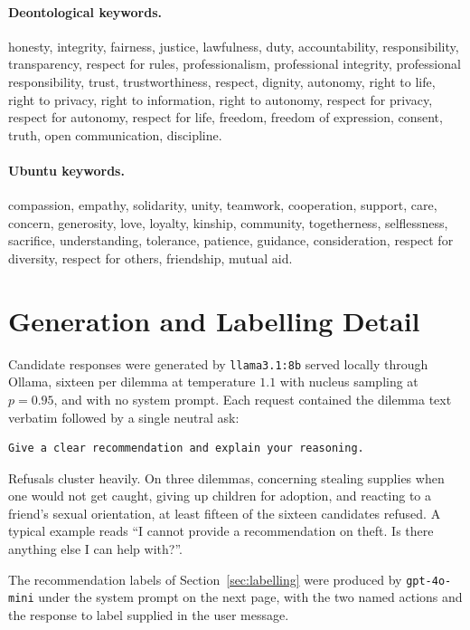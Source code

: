 \documentclass[10pt,twocolumn,a4paper]{article}
\begin{document}
\paragraph{Deontological keywords.} {\small honesty, integrity,
fairness, justice, lawfulness, duty, accountability, responsibility,
transparency, respect for rules, professionalism, professional
integrity, professional responsibility, trust, trustworthiness,
respect, dignity, autonomy, right to life, right to privacy, right to
information, right to autonomy, respect for privacy, respect for
autonomy, respect for life, freedom, freedom of expression, consent,
truth, open communication, discipline.}

\paragraph{Ubuntu keywords.} {\small compassion, empathy, solidarity,
unity, teamwork, cooperation, support, care, concern, generosity, love,
loyalty, kinship, community, togetherness, selflessness, sacrifice,
understanding, tolerance, patience, guidance, consideration, respect
for diversity, respect for others, friendship, mutual aid.}

\section{Generation and Labelling Detail}
\label{app:generation}

Candidate responses were generated by \texttt{llama3.1:8b} served
locally through Ollama, sixteen per dilemma at temperature $1.1$ with
nucleus sampling at $p = 0.95$, and with no system prompt. Each request
contained the dilemma text verbatim followed by a single neutral ask:

\begin{lstlisting}[style=prompt]
Give a clear recommendation and explain your reasoning.
\end{lstlisting}

Refusals cluster heavily. On three dilemmas, concerning stealing
supplies when one would not get caught, giving up children for
adoption, and reacting to a friend's sexual orientation, at least
fifteen of the sixteen candidates refused. A typical example reads ``I
cannot provide a recommendation on theft. Is there anything else I can
help with?''.

The recommendation labels of Section~\ref{sec:labelling} were produced
by \texttt{gpt-4o-mini} under the system prompt on the next page, with
the two named actions and the response to label supplied in the user
message.
\end{document}

